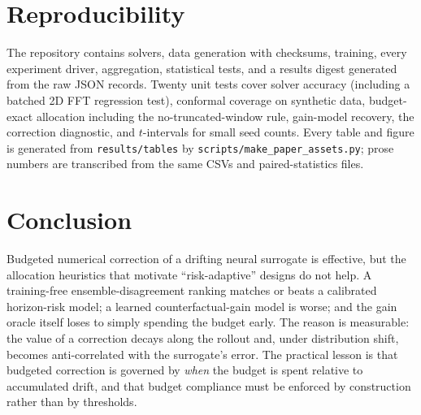\documentclass[11pt]{article}
\begin{document}
\section{Reproducibility}

The repository contains solvers, data generation with checksums, training,
every experiment driver, aggregation, statistical tests, and a results digest
generated from the raw JSON records. Twenty unit tests cover solver accuracy
(including a batched 2D FFT regression test), conformal coverage on synthetic
data, budget-exact allocation including the no-truncated-window rule, gain-model
recovery, the correction diagnostic, and $t$-intervals for small seed counts.
Every table and figure is generated from \texttt{results/tables} by
\texttt{scripts/make\_paper\_assets.py}; prose numbers are transcribed from the
same CSVs and paired-statistics files.

\section{Conclusion}

Budgeted numerical correction of a drifting neural surrogate is effective, but
the allocation heuristics that motivate ``risk-adaptive'' designs do not help.
A training-free ensemble-disagreement ranking matches or beats a calibrated
horizon-risk model; a learned counterfactual-gain model is worse; and the gain
oracle itself loses to simply spending the budget early. The reason is measurable: the value of
a correction decays along the rollout and, under distribution shift, becomes
anti-correlated with the surrogate's error. The practical lesson is that
budgeted correction is governed by \emph{when} the budget is spent relative to
accumulated drift, and that budget compliance must be enforced by construction
rather than by thresholds.



\end{document}
